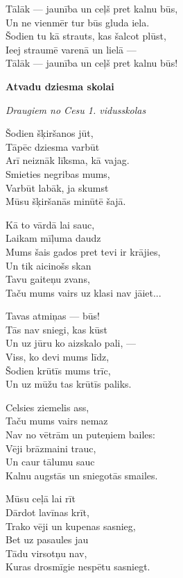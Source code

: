 \documentclass[11pt]{article}
\begin{document}
Tālāk --- jaunība un ceļš pret kalnu būs,\\
Un ne vienmēr tur būs gluda iela.\\
Šodien tu kā strauts, kas šalcot plūst,\\
Ieej straumē varenā un lielā ---\\
Tālāk --- jaunība un ceļš pret kalnu būs!

\newpage

{\bf Atvadu dziesma skolai}

{\em Draugiem no Cesu 1. vidusskolas}

Šodien šķiršanos jūt,\\
Tāpēc dziesma varbūt\\
Arī neiznāk līksma, kā vajag.\\
Smieties negribas mums,\\
Varbūt labāk, ja skumst\\
Mūsu šķiršanās minūtē šajā.

Kā to vārdā lai sauc,\\
Laikam mīļuma daudz\\
Mums šais gados pret tevi ir krājies,\\
Un tik aicinošs skan\\
Tavu gaiteņu zvans,\\
Taču mums vairs uz klasi nav jāiet...

Tavas atmiņas --- būs!\\
Tās nav sniegi, kas kūst\\
Un uz jūru ko aizskalo pali, ---\\
Viss, ko devi mums līdz,\\
Šodien krūtīs mums trīc,\\
Un uz mūžu tas krūtīs paliks.

Celsies ziemelis ass,\\
Taču mums vairs nemaz\\
Nav no vētrām un puteņiem bailes:\\
Vēji brāzmaini trauc,\\
Un caur tālumu sauc\\
Kalnu augstās un sniegotās smailes.

Mūsu ceļā lai rīt\\
Dārdot lavīnas krīt,\\
Trako vēji un kupenas sasnieg,\\
Bet uz pasaules jau\\
Tādu virsotņu nav,\\
Kuras drosmīgie nespētu sasniegt.
\end{document}
